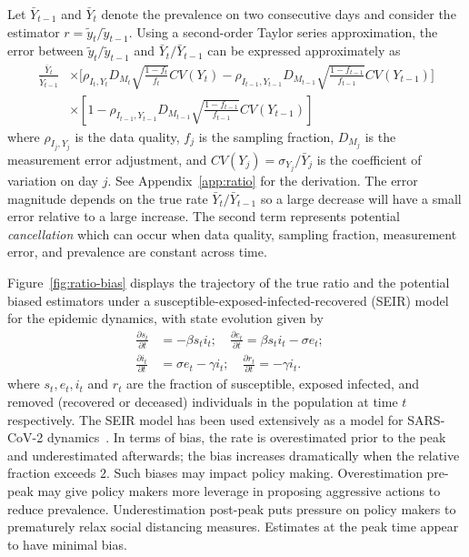 \documentclass[11pt]{amsart}
\numberwithin{equation}{section}
\theoremstyle{plain}
\begin{document}
 Let $\bar Y_{t-1}$ and $\bar Y_{t}$ denote the prevalence on two consecutive days and consider the estimator $r = \tilde y_t / \tilde y_{t-1}$.  Using a second-order Taylor series approximation, the error between ${\tilde y_t}/{\tilde y_{t-1}}$ and ${\bar Y_{t}}/{\bar Y_{t-1}}$ can be expressed approximately as
 $$
 \begin{aligned}
 \frac{\bar Y_t}{\bar Y_{t-1}} &\times \bigg[ \rho_{I_t,Y_t} D_{M_t} \sqrt{\frac{1-f_t}{f_t}} CV (Y_t)  -\rho_{I_{t-1},Y_{t-1}} D_{M_{t-1}} \sqrt{\frac{1-f_{t-1}}{f_{t-1}}} CV (Y_{t-1}) \bigg] \\
 &\times \left[ 1 - \rho_{I_{t-1},Y_{t-1}} D_{M_{t-1}} \sqrt{\frac{1-f_{t-1}}{f_{t-1}}} CV (Y_{t-1}) \right]
 \end{aligned}
 $$
 where $\rho_{I_j, Y_j}$ is the data quality, $f_j$ is the sampling fraction, $D_{M_j}$ is the measurement error adjustment, and $CV(Y_j) = \sigma_{Y_j}/ \bar Y_j$ is the coefficient of variation on day $j$.  See Appendix~\ref{app:ratio} for the derivation. The error magnitude depends on the true rate $\bar Y_{t} / \bar Y_{t-1}$ so a large decrease will have a small error relative to a large increase. The second term represents potential \emph{cancellation} which can  occur when data quality, sampling fraction, measurement error, and prevalence are constant across time.

 Figure~\ref{fig:ratio-bias} displays the trajectory of the true ratio and the potential biased estimators under a susceptible-exposed-infected-recovered (SEIR) model~\citep{Pastor2001,Newman2002,Parshani2010} for the epidemic dynamics, with state evolution given by
 \begin{align}
 \frac{\partial s_t}{\partial t} &= - \beta s_t i_t; \quad \frac{\partial e_t}{\partial t} = \beta s_t i_t - \sigma e_t; \quad \label{eq:seir} \\
 \frac{\partial i_t}{\partial t} &= \sigma e_t - \gamma i_t; \quad
 \frac{\partial r_t}{\partial t} = - \gamma i_t. \nonumber
\end{align}
 where $s_t, e_t, i_t$ and $r_t$ are the fraction of susceptible, exposed infected, and removed (recovered or deceased) individuals in the population at time $t$ respectively.  The SEIR model has been used extensively as a model for SARS-CoV-2 dynamics~\cite{Song2020}.  In terms of bias, the rate is overestimated prior to the peak and underestimated afterwards; the bias increases dramatically when the relative fraction exceeds $2$.  Such biases may impact policy making.  Overestimation pre-peak may give policy makers more leverage in proposing aggressive actions to reduce prevalence.  Underestimation post-peak puts pressure on policy makers to prematurely relax social distancing measures.  Estimates at the peak time appear to have minimal bias.
\end{document}
